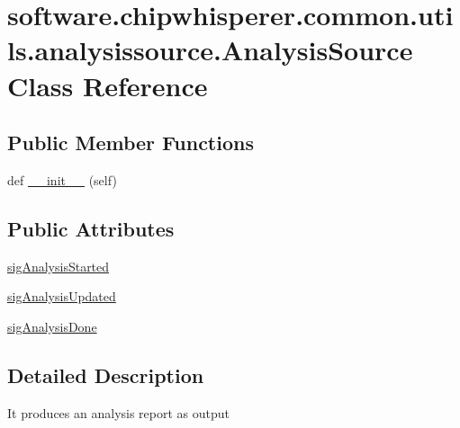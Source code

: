 \hypertarget{classsoftware_1_1chipwhisperer_1_1common_1_1utils_1_1analysissource_1_1AnalysisSource}{}\section{software.\+chipwhisperer.\+common.\+utils.\+analysissource.\+Analysis\+Source Class Reference}
\label{classsoftware_1_1chipwhisperer_1_1common_1_1utils_1_1analysissource_1_1AnalysisSource}
\subsection*{Public Member Functions}
\begin{DoxyCompactItemize}
\item 
def \hyperlink{classsoftware_1_1chipwhisperer_1_1common_1_1utils_1_1analysissource_1_1AnalysisSource_a577c5b536e1d62464694f0f742f5fb94}{\+\_\+\+\_\+init\+\_\+\+\_\+} (self)
\end{DoxyCompactItemize}
\subsection*{Public Attributes}
\begin{DoxyCompactItemize}
\item 
\hyperlink{classsoftware_1_1chipwhisperer_1_1common_1_1utils_1_1analysissource_1_1AnalysisSource_afc000acecf85d8c8c661a718e0bf7e8d}{sig\+Analysis\+Started}
\item 
\hyperlink{classsoftware_1_1chipwhisperer_1_1common_1_1utils_1_1analysissource_1_1AnalysisSource_a829759e9661bf65cb8b21458f2dfb1e3}{sig\+Analysis\+Updated}
\item 
\hyperlink{classsoftware_1_1chipwhisperer_1_1common_1_1utils_1_1analysissource_1_1AnalysisSource_ae70f361ae048f03e7d1cfbdc09fb22db}{sig\+Analysis\+Done}
\end{DoxyCompactItemize}


\subsection{Detailed Description}
\begin{DoxyVerb}It produces an analysis report as output \end{DoxyVerb}
 

